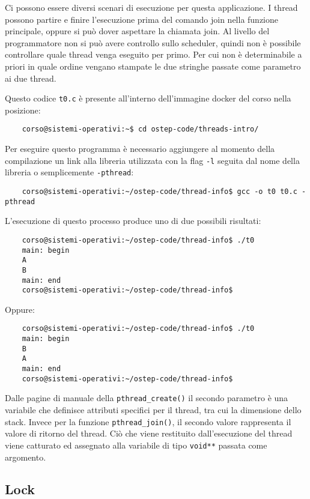 \documentclass{article}
\numberwithin{equation}{subsection}
\begin{document}
Ci possono essere diversi scenari di esecuzione per questa applicazione. I thread possono partire e finire l'esecuzione prima del comando join nella funzione principale, oppure si può dover 
aspettare la chiamata join. Al livello del programmatore non si può avere controllo sullo scheduler, quindi non è possibile controllare quale thread venga eseguito per primo. Per cui 
non è determinabile a priori in quale ordine vengano stampate le due stringhe passate come parametro ai due thread. 

Questo codice \verb|t0.c| è presente all'interno dell'immagine docker del corso nella posizione:
\begin{verbatim}
    corso@sistemi-operativi:~$ cd ostep-code/threads-intro/
\end{verbatim} 
Per eseguire questo programma è necessario aggiungere al momento 
della compilazione un link alla libreria utilizzata con la flag \verb|-l| seguita dal nome della libreria o semplicemente \verb|-pthread|: 
\begin{verbatim}
    corso@sistemi-operativi:~/ostep-code/thread-info$ gcc -o t0 t0.c -pthread 
\end{verbatim}
L'esecuzione di questo processo produce uno di due possibili risultati: %
\begin{verbatim}
    corso@sistemi-operativi:~/ostep-code/thread-info$ ./t0
    main: begin
    A
    B
    main: end
    corso@sistemi-operativi:~/ostep-code/thread-info$
\end{verbatim}
Oppure: 
\begin{verbatim}
    corso@sistemi-operativi:~/ostep-code/thread-info$ ./t0
    main: begin
    B
    A
    main: end
    corso@sistemi-operativi:~/ostep-code/thread-info$
\end{verbatim}

Dalle pagine di manuale della \verb|pthread_create()| il secondo parametro è una variabile che definisce attributi specifici per il thread, tra cui la dimensione dello stack. Invece per la 
funzione \verb|pthread_join()|, il secondo valore rappresenta il valore di ritorno del thread. Ciò che viene restituito dall'esecuzione del thread viene catturato ed assegnato alla variabile 
di tipo \verb|void**| passata come argomento. 

\subsection{Lock}

\end{document}
